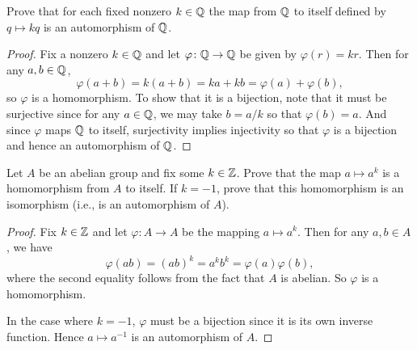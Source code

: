  Prove that for each fixed nonzero $k\in\mathbb{Q}$ the map from
$\mathbb{Q}$ to itself defined by $q\mapsto kq$ is an automorphism of $\mathbb{Q}$.
\begin{proof}
  Fix a nonzero $k\in\mathbb{Q}$ and let $\varphi\colon\mathbb{Q}\to\mathbb{Q}$ be given by
  $\varphi(r) = kr$. Then for any $a,b\in\mathbb{Q}$,
  \begin{equation*}
    \varphi(a + b) = k(a + b) = ka + kb = \varphi(a) + \varphi(b),
  \end{equation*}
  so $\varphi$ is a homomorphism. To show that it is a bijection, note
  that it must be surjective since for any $a\in\mathbb{Q}$, we may take
  $b = a/k$ so that $\varphi(b) = a$. And since $\varphi$ maps $\mathbb{Q}$ to
  itself, surjectivity implies injectivity so that $\varphi$ is a
  bijection and hence an automorphism of $\mathbb{Q}$.
\end{proof}

 Let $A$ be an abelian group and fix some $k\in\mathbb{Z}$. Prove
that the map $a\mapsto a^k$ is a homomorphism from $A$ to itself. If
$k = -1$, prove that this homomorphism is an isomorphism (i.e., is an
automorphism of $A$).
\begin{proof}
  Fix $k\in\mathbb{Z}$ and let $\varphi\colon A\to A$ be the mapping
  $a\mapsto a^k$. Then for any $a,b\in A$, we have
  \begin{equation*}
    \varphi(ab) = (ab)^k = a^kb^k = \varphi(a)\varphi(b),
  \end{equation*}
  where the second equality follows from the fact that $A$ is
  abelian. So $\varphi$ is a homomorphism.

  In the case where $k=-1$, $\varphi$ must be a bijection since it is
  its own inverse function. Hence $a\mapsto a^{-1}$ is an automorphism
  of $A$.
\end{proof}

